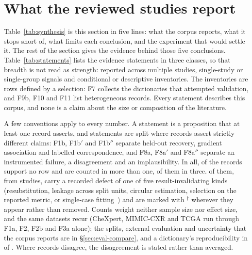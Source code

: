 \section{What the reviewed studies report}
\label{sec:findings}







Table~\ref{tab:synthesis} is this section in five lines: what the corpus reports, what it stops short
of, what limits each conclusion, and the experiment that would settle it. The rest of the section gives
the evidence behind those five conclusions. Table~\ref{tab:statements} lists the \Fnrows{} evidence
statements in three classes, so that breadth is not read as strength: \Fnmulti{} reported across
multiple studies, \Fnsingle{} single-study or single-group signals and \Fncond{} conditional or
descriptive inventories. The inventories are rows defined by a selection: F7 collects the dictionaries
that attempted validation, and F9b, F10 and F11 list heterogeneous records. Every statement describes
this corpus, and none is a claim about the size or composition of the literature.

A few conventions apply to every number. A statement is a proposition that at least one record asserts,
and statements are split where records assert strictly different claims: F1b, F1b$'$ and F1b$''$
separate held-out recovery, gradient association and labelled correspondence, and F8a, F8a$'$ and
F8a$''$ separate an instrumented failure, a disagreement and an implausibility. In all, of the \Nclaims{}
records \Fnorow{} support no row and \Fmultirow{} are counted in more than one, \Fmultithree{} of them
in three. \Fflagrec{} of them, from \Fdefstud{} studies, carry a recorded defect of one of five
result-invalidating kinds (resubstitution, leakage across split units, circular estimation, selection on
the reported metric, or single-case fitting~\cite{kapoor2023leakage}) and are marked with $^{\dagger}$
wherever they appear rather than removed. Counts weight neither sample size nor effect size, and the same
datasets recur (CheXpert, MIMIC-CXR and TCGA run through F1a, F2, F2b and F3a alone); the splits,
external evaluation and uncertainty that the corpus reports are in \S\ref{sec:eval-compare}, and a
dictionary's reproducibility in \Nsaestab{} of \Nsae{}. Where records disagree, the disagreement is
stated rather than averaged.

